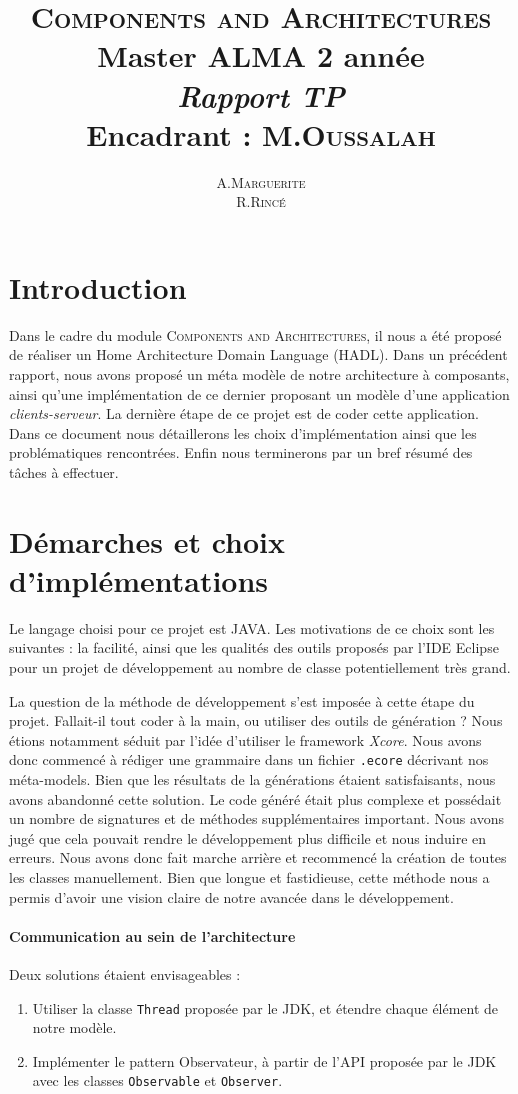 \documentclass[11pt]{article}
\title{ {\huge \textsc{Components and Architectures}} \\  Master ALMA 2\up{eme} année  \\ \emph{Rapport TP}\\{\small Encadrant :  M.\textsc{Oussalah}}}
\author{A.\textsc{Marguerite} \\ R.\textsc{Rincé}}
\begin{document}
\maketitle
\renewcommand{\labelitemi}{$\bullet$} 



\section{Introduction}\label{sec:intro}
Dans le cadre du module \textsc{Components and Architectures}, il nous a été proposé de réaliser un Home Architecture Domain Language (HADL). Dans un précédent rapport, nous avons proposé un méta modèle de notre architecture à composants, ainsi qu'une implémentation de ce dernier proposant un modèle d'une application \textit{clients-serveur}. La dernière étape de ce projet est de coder cette application. Dans ce document nous détaillerons les choix d'implémentation ainsi que les problématiques rencontrées. Enfin nous terminerons par un bref résumé des tâches à effectuer.
\section{Démarches et choix d'implémentations}\label{sec:pblm}
Le langage choisi pour ce projet est JAVA. Les motivations de ce choix sont les suivantes : la facilité, ainsi que les qualités des outils proposés par l'IDE Eclipse pour un projet de développement au nombre de classe potentiellement très grand. 

La question de la méthode de développement s'est imposée à cette étape du projet. Fallait-il tout coder à la main, ou utiliser des outils de génération ? Nous étions notamment séduit par l'idée d'utiliser le framework \emph{Xcore}. Nous avons donc commencé à rédiger une grammaire dans un fichier \verb+.ecore+ décrivant nos méta-models. Bien que les résultats de la générations étaient satisfaisants, nous avons abandonné cette solution. Le code généré était plus complexe et possédait un nombre de signatures et de méthodes supplémentaires important. Nous avons jugé que cela pouvait rendre le développement plus difficile et nous induire en erreurs. Nous avons donc fait marche arrière et recommencé la création de toutes les classes manuellement. Bien que longue et fastidieuse, cette méthode nous a permis d'avoir une vision claire de notre avancée dans le développement.

\paragraph{Communication au sein de l'architecture}
Deux solutions étaient envisageables :
\begin{enumerate}
\item
  Utiliser la classe \verb+Thread+ proposée par le JDK, et étendre chaque élément de notre modèle. 
\item
  Implémenter le pattern Observateur, à partir de l'API proposée par le JDK avec les classes \verb+Observable+ et \verb+Observer+.
\end{enumerate} 
\end{document}
